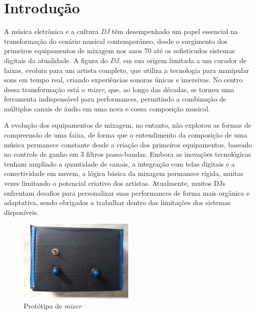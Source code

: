\chapter[Introdução]{Introdução}

A música eletrônica e a cultura \textit{DJ} têm desempenhado um papel essencial na transformação do cenário musical contemporâneo, desde o surgimento dos primeiros equipamentos de mixagem nos anos 70 até os sofisticados sistemas digitais da atualidade. A figura do \textit{DJ}, em sua origem limitada a um curador de faixas, evoluiu para um artista completo, que utiliza a tecnologia para manipular sons em tempo real, criando experiências sonoras únicas e imersivas. No centro dessa transformação está o \textit{mixer}, que, ao longo das décadas, se tornou uma ferramenta indispensável para performances, permitindo a combinação de múltiplos canais de áudio em uma nova e coesa composição musical.

A evolução dos equipamentos de mixagem, no entanto, não explorou as formas de compreensão de uma faixa, de forma que o entendimento da composição de uma música permanece constante desde a criação dos primeiros equipamentos, baseado no controle de ganho em 3 filtros passa-bandas. Embora as inovações tecnológicas tenham ampliado a quantidade de canais, a integração com telas digitais e a conectividade em nuvem, a lógica básica da mixagem permanece rígida, muitas vezes limitando o potencial criativo dos artistas. Atualmente, muitos DJs enfrentam desafios para personalizar suas performances de forma mais orgânica e adaptativa, sendo obrigados a trabalhar dentro das limitações dos sistemas disponíveis.

\begin{figure}[h]
    \centering
    \includegraphics[width=0.5\textwidth]{figuras/fig97.jpg}
    \caption{Protótipo de \textit{mixer}}
    \label{fig97}
\end{figure}

